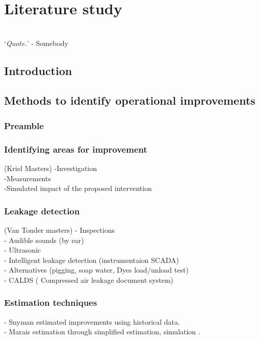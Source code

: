 \chapter{Literature study}
\thispagestyle{empty}
\vspace{38em}
\hrulefill
\\
\enquote*{\textit{Quote.}} - Somebody\\
\newpage
\section{Introduction}
\section{Methods to identify operational improvements}
	\subsection{Preamble}
	\subsection{Identifying areas for improvement}
		(Kriel Masters)
		-Investigation\\
		-Measurements\\
		-Simulated impact of the proposed intervention\\

	\subsection{Leakage detection}
		(Van Tonder masters)
		- Inspections\\
		- Audible sounds (by ear)\\
		- Ultrasonic\\
		- Intelligent leakage detection (instrumentaion SCADA)\\
		- Alternatives (pigging, soap water, Dyes load/unload test)\\
		-  CALDS ( Compressed air leakage document system)\\

	\subsection{Estimation techniques}
		- Snyman estimated improvements using historical data.\cite{Snyman2011Masters}\\
		- Marais estimation through simplified estimation, simulation \cite{Marais2012PhD, marais2013simplification}.

